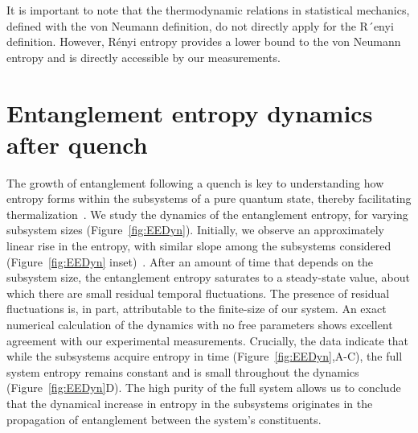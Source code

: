 It is important to note that the thermodynamic relations in statistical mechanics, defined with the
von Neumann definition, do not directly apply for the R´enyi definition. However, R\'{e}nyi entropy provides a lower bound to the von Neumann entropy and is directly accessible by our measurements.

\section{Entanglement entropy dynamics after quench}
The growth of entanglement following a quench is key to understanding how entropy forms within the subsystems of a pure quantum state, thereby facilitating thermalization~\cite{CardyOneD, Daley2012, Schachenmayer2013, Hazzard2014}. We study the dynamics of the entanglement entropy, for varying subsystem sizes (Figure~\ref{fig:EEDyn}). Initially, we observe an approximately linear rise in the entropy, with similar slope among the subsystems considered (Figure~\ref{fig:EEDyn} inset)~\cite{CardyOneD}. After an amount of time that depends on the subsystem size, the entanglement entropy saturates to a steady-state value, about which there are small residual temporal fluctuations. The presence of residual fluctuations is, in part, attributable to the finite-size of our system. An exact numerical calculation of the dynamics with no free parameters shows excellent agreement with our experimental measurements. Crucially, the data indicate that while the subsystems acquire entropy in time (Figure~\ref{fig:EEDyn},A-C), the full system entropy remains constant and is small throughout the dynamics (Figure~\ref{fig:EEDyn}D). The high purity of the full system allows us to conclude that the dynamical increase in entropy in the subsystems originates in the propagation of entanglement between the system's constituents. 

